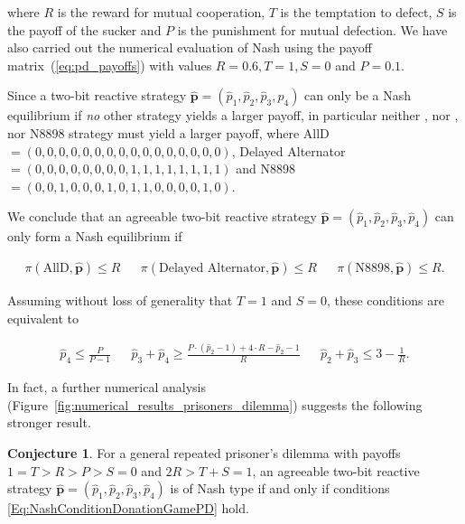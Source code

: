 \documentclass{article}
\theoremstyle{definition}
\newtheorem{conjecture}[theorem]{Conjecture}
\begin{document}
where \(R\) is the reward for mutual cooperation, \(T\) is the temptation to
defect, \(S\) is the payoff of the sucker and \(P\) is the punishment for mutual
defection. We have also carried out the numerical evaluation of Nash using the
payoff matrix~(\ref{eq:pd_payoffs}) with values \(R=0.6, T=1, S=0\) and
\(P=0.1\).

Since a two-bit reactive strategy \(\mathbf{\hat{p}} = (\hat{p}_{1},
\hat{p}_{2}, \hat{p}_{3}, \hat{p}_{4})\) can only be a Nash equilibrium if {\it
no} other strategy yields a larger payoff, in particular neither ,
nor , nor N8898 strategy must yield a larger payoff, where AllD\(=(0,
0, 0, 0, 0, 0, 0, 0, 0, 0, 0, 0, 0, 0, 0, 0)\), Delayed Alternator\(=(0, 0, 0,
0, 0, 0, 0, 0, 1, 1, 1, 1, 1, 1, 1, 1)\) and N8898\(=(0, 0, 1, 0, 0, 0, 1, 0, 1,
1, 0, 0, 0, 0, 1, 0)\).

We conclude that an agreeable two-bit reactive strategy  \(\mathbf{\hat{p}} =
(\hat{p}_{1}, \hat{p}_{2}, \hat{p}_{3}, \hat{p}_{4})\) can only form a Nash
equilibrium if

\begin{align*}
\pi(\text{AllD}, \mathbf{\hat{p}}) \leq R & & \pi(\text{Delayed Alternator}, \mathbf{\hat{p}}) \leq R & & \pi(\text{N8898}, \mathbf{\hat{p}}) \leq R.
\end{align*}

Assuming without loss of generality that $T\!=\!1$ and $S\!=\!0$, these conditions are equivalent to

\begin{align}\label{Eq:NashConditionDonationGamePD}
  \hat{p}_4 \leq \frac{P}{P \!- \!1} & & \hat{p}_3 + \hat{p}_4 \geq \frac{P \cdot (\hat{p}_2 \!- \!1) + 4 \cdot R \!- \!\hat{p}_2 \!- \!1}{R} &  &  \hat{p}_2 + \hat{p}_3 \leq 3 \!- \!\frac{1}{R}.
\end{align}

In fact, a further numerical analysis (Figure~\ref{fig:numerical_results_prisoners_dilemma}) suggests the following stronger result. 

\begin{conjecture}\label{conjecture:nash_from_numerical_results_pd}
For a general repeated prisoner's dilemma with payoffs $1=T>R>P>S=0$ and $2R>T\!+\!S=1$, an agreeable two-bit reactive strategy \(\mathbf{\hat{p}} = (\hat{p}_{1}, \hat{p}_{2}, \hat{p}_{3}, \hat{p}_{4})\) is of Nash type if and only if conditions \eqref{Eq:NashConditionDonationGamePD} hold.
\end{conjecture}
\end{document}
